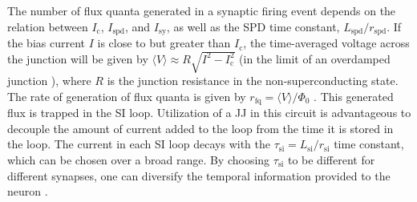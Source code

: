 \documentclass[aip,amsmath,amssymb,reprint,nofootinbib]{revtex4-1}
\begin{document}
The number of flux quanta generated in a synaptic firing event depends on the relation between $I_{\mathrm{c}}$, $I_{\mathrm{spd}}$, and $I_{\mathrm{sy}}$, as well as the SPD time constant, $L_{\mathrm{spd}}/r_{\mathrm{spd}}$. If the bias current $I$ is close to but greater than $I_{\mathrm{c}}$, the time-averaged voltage across the junction will be given by $\langle V \rangle \approx R \sqrt{I^2-I_{\mathrm{c}}^2}$ (in the limit of an overdamped junction \cite{ka1999}), where $R$ is the junction resistance in the non-superconducting state. The rate of generation of flux quanta is given by $r_{\mathrm{fq}} = \langle V \rangle/\Phi_0$ \cite{ka1999}. This generated flux is trapped in the SI loop. Utilization of a JJ in this circuit is advantageous to decouple the amount of current added to the loop from the time it is stored in the loop. The current in each SI loop decays with the $\tau_{\mathrm{si}} = L_{\mathrm{si}}/r_{\mathrm{si}}$ time constant, which can be chosen over a broad range. By choosing $\tau_{\mathrm{si}}$ to be different for different synapses, one can diversify the temporal information provided to the neuron \cite{stsa2000,abre2004,budr2004,be2007}.
\end{document}
